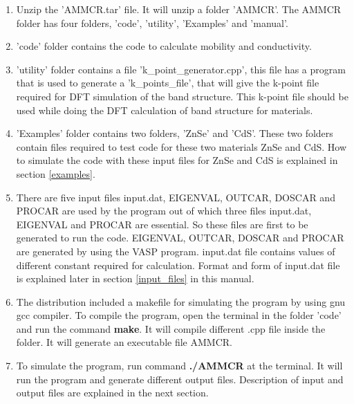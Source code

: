 \documentclass[12pt]{article}
\begin{document}
\begin{enumerate}

\item Unzip the 'AMMCR.tar' file. It will unzip a folder 'AMMCR'. The AMMCR folder has four folders, 'code', 'utility', 'Examples' and 'manual'. 

\item 'code' folder contains the code to calculate mobility and conductivity. 

\item 'utility' folder contains a file 'k\_point\_generator.cpp', this file has a program that is used to generate a 'k\_points\_file', that will give the k-point file required for DFT simulation of the band structure. This k-point file should be used while doing the DFT calculation of band structure for materials.   

\item 'Examples' folder contains two folders, 'ZnSe' and 'CdS'. These two folders contain files required to test code for these two materials ZnSe and CdS. How to simulate the code with these input files for ZnSe and CdS is explained in section \ref{examples}.  

\item There are five input files input.dat, EIGENVAL, OUTCAR, DOSCAR and PROCAR are used by the program out of which three files input.dat, EIGENVAL and PROCAR are essential. So these files are first to be generated to run the code. EIGENVAL, OUTCAR, DOSCAR and PROCAR are generated by using the VASP program\cite{ref4,ref5,ref6}. input.dat file contains values of different constant required for calculation. Format and form of input.dat file is explained later in section \ref{input_files} in this manual.  

\item The distribution included a makefile for simulating the program by using gnu gcc compiler.  To compile the program, open the terminal in the folder 'code' and run the command \textbf{make}. It will compile different .cpp file inside the folder. It will generate an executable file AMMCR.

\item To simulate the program, run command \textbf{./AMMCR} at the terminal. It will run the program and generate different output files. Description of input and output files are explained in the next section. 

\end{enumerate} 
 
\end{document}

